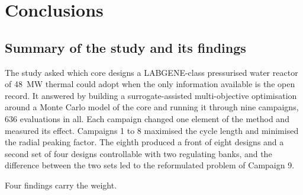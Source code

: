 
\chapter{Conclusions}
\label{ch:conclusions}

\section{Summary of the study and its findings}
\label{sec:concl-answer}

The study asked which core designs a LABGENE-class pressurised water
reactor of \SI{48}{MW} thermal could adopt when the only information
available is the open record. It answered by building a
surrogate-assisted multi-objective optimisation around a Monte Carlo
model of the core and running it through nine campaigns, 636
evaluations in all. Each campaign changed one element of the method and
measured its effect. Campaigns 1 to 8 maximised the cycle length and
minimised the radial peaking factor. The eighth produced a front of
eight designs and a second set of four designs controllable with two
regulating banks, and the difference between the two sets led to the
reformulated problem of Campaign 9.

Four findings carry the weight.

